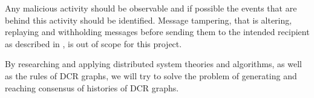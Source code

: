 	Any malicious activity should be observable and if possible the events that are behind this activity should be identified. Message tampering, that is altering, replaying and withholding messages before sending them to the intended recipient as described in \cite{Coulouris:2011:DSC:2029110:chapter2}, is out of scope for this project.

	\newpar By researching and applying distributed system theories and algorithms, as well as the rules of DCR graphs, we will try to solve the problem of generating and reaching consensus of histories of DCR graphs.